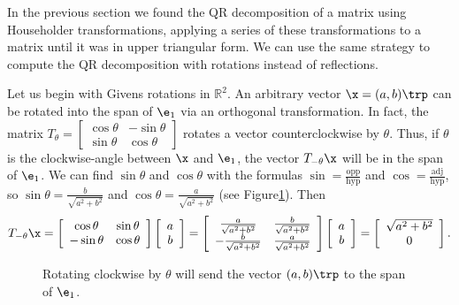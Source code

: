 In the previous section we found the QR decomposition of a matrix using Householder transformations, applying a series of these transformations to a matrix until it was in upper triangular form.
We can use the same strategy to compute the QR decomposition with rotations instead of reflections.

Let us begin with Givens rotations in $\mathbb{R}^2$.
An arbitrary vector $\x = (a, b)\trp$ can be rotated into the span of $\e_1$ via an orthogonal transformation.
In fact, the matrix $T_{\theta} = \left[\begin{array}{cc}\cos \theta & - \sin \theta \\ \sin \theta & \cos \theta \end{array}\right]$ rotates a vector counterclockwise by $\theta$.
Thus, if $\theta$ is the clockwise-angle between $\x$ and $\e_1$, the vector $T_{-\theta}\x$ will be in the span of $\e_1$.
We can find $\sin \theta$ and $\cos \theta$ with the formulas $\sin = \frac{\text{opp}}{\text{hyp}}$ and $\cos = \frac{\text{adj}}{\text{hyp}}$, so $\sin \theta = \frac{b}{\sqrt{a^2+b^2}}$ and $\cos \theta =  \frac{a}{\sqrt{a^2+b^2}}$ (see Figure\ref{fig:angle}).
Then
\[
T_{-\theta}\x
=
\left[\begin{array}{cc}
\cos\theta  & \sin\theta \\
-\sin\theta & \cos\theta \\
\end{array}\right]
\left[\begin{array}{c} a \\ b \end{array}\right]
=
\left[\begin{array}{cc}
 \frac{a}{\sqrt{a^2+b^2}} & \frac{b}{\sqrt{a^2+b^2}} \\
-\frac{b}{\sqrt{a^2+b^2}} & \frac{a}{\sqrt{a^2+b^2}} \\
\end{array}\right]
\left[\begin{array}{c} a \\ b \end{array}\right]
=
\left[\begin{array}{c} \sqrt{a^2+b^2} \\ 0 \end{array}\right].
\]

\begin{figure}[H]
\begin{center}
\caption{Rotating clockwise by $\theta$ will send the vector $(a,b)\trp$ to the span of $\e_1$.}
\label{fig:angle}
\end{center}
\end{figure}

